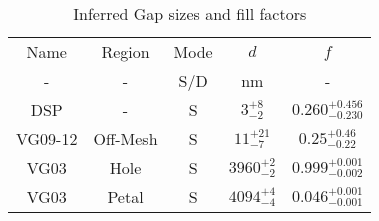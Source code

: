 \begin{table}[h!]
\caption{Inferred Gap sizes and fill factors \label{tbl_DerivedGapSizes}}
\begin{center}
    \begin{tabular}{ c c c c c }
    \hline
    Name & Region & Mode & $d$ & $f$ \\
    -  & - & S/D & nm & - \\
    \hline
    DSP & -    &   S  & $3^{+8}_{-2}$ & $0.260^{+0.456}_{-0.230}$\\
    VG09-12 & Off-Mesh    &   S  & $11^{+21}_{-7}$ & $0.25^{+0.46}_{-0.22}$\\
    VG03 & Hole    &   S  & $3960^{+2}_{-2}$ &  $0.999^{+0.001}_{-0.002}$\\
    VG03 & Petal   &   S  & $4094^{+4}_{-4}$ &  $0.046^{+0.001}_{-0.001}$\\
    \hline
    \end{tabular}
\end{center}
\end{table}